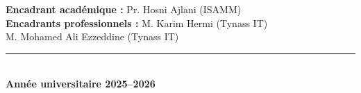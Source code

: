 \begin{titlepage}
\begin{center}
\begin{minipage}{0.95\textwidth}
    \raggedright

    \textbf{Encadrant académique :}
    Pr. Hosni Ajlani
    {\color{covergray}(ISAMM)}
    \\[0.35cm]

    \textbf{Encadrants professionnels :}
    M. Karim Hermi
    {\color{covergray}(Tynass IT)}
    \\[0.12cm]

    \hspace*{4.55cm}
    M. Mohamed Ali Ezzeddine
    {\color{covergray}(Tynass IT)}
\end{minipage}
\vfill
{\color{coverblue}\rule{1\textwidth}{1pt}}\\[0.3cm]
{\large\bfseries Année universitaire 2025--2026}
\end{center}
\end{titlepage}